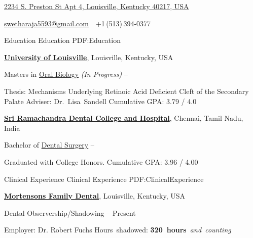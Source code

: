 \documentclass[letterpaper,MMMyyyy,nonstopmode]{simpleresumecv}
\newcommand{\CVAuthor}{Swetha Raja}
\newcommand{\uLouisville}{\href{http://louisville.edu/dentistry}
{\textbf{University of Louisville}},
Louisville, Kentucky, USA}
\begin{document}

\Title{\CVAuthor}

\begin{SubTitle}
\href{https://www.google.com/maps/place/2234+S+Preston+St,+Louisville,+KY+40217}
{2234 S. Preston St Apt 4, Louisville, Kentucky 40217, USA}
\par
\href{mailto:swetharaja5593@gmail.com}
{swetharaja5593@gmail.com}
\,\SubBulletSymbol\,
+1\,(513)\,394-0377
\end{SubTitle}

\begin{Body}


\Section
{Education}
{Education}
{PDF:Education}

\Entry
\uLouisville

\Gap
\BulletItem
Masters in
\href{https://louisville.edu/dentistry/sandelllab}
{Oral Biology}
\textit{(In Progress)}
\hfill
{} --
\begin{Detail}
\SubBulletItem
Thesis:
Mechanisms Underlying Retinoic Acid Deficient Cleft of the Secondary Palate
\SubBulletItem
Adviser:
Dr.~Lisa~Sandell
\SubBulletItem
Cumulative GPA: 3.79 / 4.0
\end{Detail}

\BigGap
\Entry
\href{http://www.sriramachandra.edu.in/}
{\textbf{Sri Ramachandra Dental College and Hospital}},
Chennai, Tamil Nadu, India

\Gap
\BulletItem
Bachelor of
\href{http://www.sriramachandra.edu.in/university/dci}
{Dental Surgery}
\hfill
{} --
\begin{Detail}
\SubBulletItem
Graduated with College Honors.
\SubBulletItem
Cumulative GPA: 3.96 / 4.00
\end{Detail}

\Section
{Clinical Experience}
{Clinical Experience}
{PDF:ClinicalExperience}

\Entry
\href{http://mortensondental.com/}
{\textbf{Mortensons Family Dental}},
Louisville, Kentucky, USA

\Gap
\BulletItem
Dental Observership/Shadowing
\hfill
{} --
Present
\begin{Detail}
\SubBulletItem
Employer:
Dr. Robert Fuchs
\SubBulletItem
Hours~shadowed: 
\textbf{320~hours}\textit{~and~counting}
\end{Detail}



\end{Body}
\end{document}
